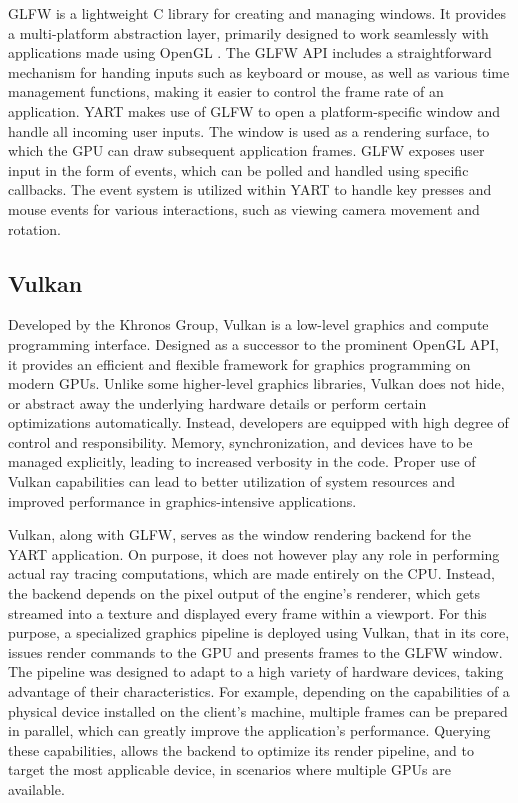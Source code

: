 GLFW \supercite{GLFW} is a lightweight C library for creating and managing windows.
It provides a multi-platform abstraction layer, primarily designed to work seamlessly with applications made using OpenGL \supercite{Neider1993}.
The GLFW API includes a straightforward mechanism for handing inputs such as keyboard or mouse, as well as various time management functions, making it easier to control the frame rate of an application.
YART makes use of GLFW to open a platform-specific window and handle all incoming user inputs. 
The window is used as a rendering surface, to which the GPU can draw subsequent application frames. 
GLFW exposes user input in the form of events, which can be polled and handled using specific callbacks. 
The event system is utilized within YART to handle key presses and mouse events for various interactions, such as viewing camera movement and rotation.

\subsection{Vulkan}

Developed by the Khronos Group, Vulkan \supercite{Sellers2016} is a low-level graphics and compute programming interface.
Designed as a successor to the prominent OpenGL API, it provides an efficient and flexible framework for graphics programming on modern GPUs.
Unlike some higher-level graphics libraries, Vulkan does not hide, or abstract away the underlying hardware details or perform certain optimizations automatically. 
Instead, developers are equipped with high degree of control and responsibility.
Memory, synchronization, and devices have to be managed explicitly, leading to increased verbosity in the code.
Proper use of Vulkan capabilities can lead to better utilization of system resources and improved performance in graphics-intensive applications.

Vulkan, along with GLFW, serves as the window rendering backend for the YART application.
On purpose, it does not however play any role in performing actual ray tracing computations, which are made entirely on the CPU. 
Instead, the backend depends on the pixel output of the engine's renderer, which gets streamed into a texture and displayed every frame within a viewport.
For this purpose, a specialized graphics pipeline is deployed using Vulkan, that in its core, issues render commands to the GPU and presents frames to the GLFW window. The pipeline was designed to adapt to a high variety of hardware devices, taking advantage of their characteristics.
For example, depending on the capabilities of a physical device installed on the client's machine, multiple frames can be prepared in parallel, which can greatly improve the application's performance.
Querying these capabilities, allows the backend to optimize its render pipeline, and to target the most applicable device, in scenarios where multiple GPUs are available.

